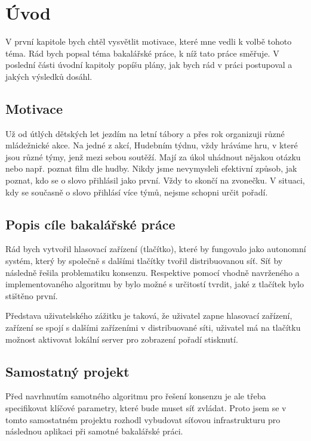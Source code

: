 

\chapter{Úvod}

V první kapitole bych chtěl vysvětlit motivace, které mne vedli k volbě tohoto téma. Rád bych popsal téma bakalářské práce, k níž tato práce směřuje. V poslední části úvodní kapitoly popíšu plány, jak bych rád v práci postupoval a jakých výsledků dosáhl.

\section{Motivace}

Už od útlých dětských let jezdím na letní tábory a přes rok organizuji různé mládežnické akce. Na jedné z akcí, Hudebním týdnu, vždy hráváme hru, v které jsou různé týmy, jenž mezi sebou soutěží. Mají za úkol uhádnout nějakou otázku nebo např. poznat film dle hudby. Nikdy jsme nevymysleli efektivní způsob, jak poznat, kdo se o slovo přihlásil jako první. Vždy to skončí na zvonečku. V situaci, kdy se současně o slovo přihlásí více týmů, nejsme schopni určit pořadí. 

\section{Popis cíle bakalářské práce}

Rád bych vytvořil hlasovací zařízení (tlačítko), které by fungovalo jako autonomní systém, který by společně s dalšími tlačítky tvořil distribuovanou síť. Síť by následně řešila problematiku konsenzu. Respektive pomocí vhodně navrženého a implementovaného algoritmu by bylo možné s určitostí tvrdit, jaké z tlačítek bylo stištěno první. 

Představa uživatelského zážitku je taková, že uživatel zapne hlasovací zařízení, zařízení se spojí s dalšími zařízeními v distribuované síti, uživatel má na tlačítku možnost aktivovat lokální server pro zobrazení pořadí stisknutí. 

\section{Samostatný projekt}

Před navrhnutím samotného algoritmu pro řešení konsenzu je ale třeba specifikovat klíčové parametry, které bude muset síť zvládat. Proto jsem se v tomto samostatném projektu rozhodl vybudovat síťovou infrastrukturu pro následnou aplikaci při samotné bakalářské práci. 


